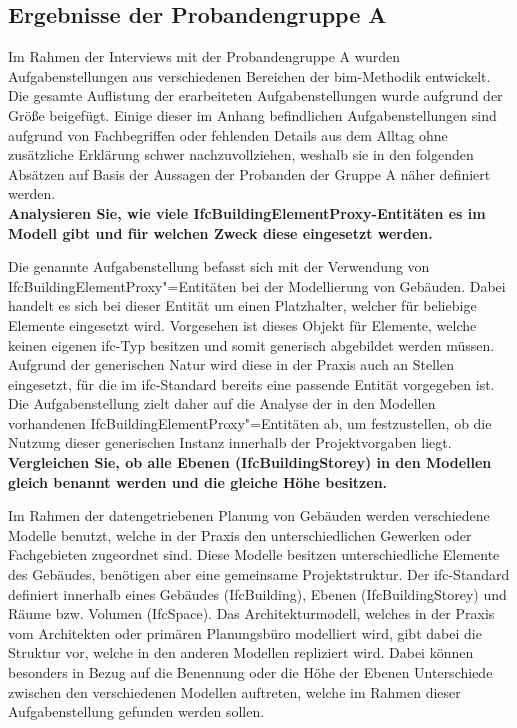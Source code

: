 \subsection{Ergebnisse der Probandengruppe A}
\label{sec:results-group-a}

Im Rahmen der Interviews mit der Probandengruppe A wurden Aufgabenstellungen aus verschiedenen Bereichen der \gls{bim}-Methodik entwickelt.
Die gesamte Auflistung der erarbeiteten Aufgabenstellungen wurde aufgrund der Größe beigefügt. 
Einige dieser im Anhang befindlichen Aufgabenstellungen sind aufgrund von Fachbegriffen oder fehlenden Details aus dem Alltag ohne zusätzliche Erklärung schwer nachzuvollziehen,
weshalb sie in den folgenden Absätzen auf Basis der Aussagen der Probanden der Gruppe A näher definiert werden. \\

\textbf{Analysieren Sie, wie viele IfcBuildingElementProxy-Entitäten es im Modell gibt und für welchen Zweck diese eingesetzt werden.}

Die genannte Aufgabenstellung befasst sich mit der Verwendung von IfcBuildingElementProxy"=Entitäten bei der Modellierung von Gebäuden. 
Dabei handelt es sich bei dieser Entität um einen Platzhalter, welcher für beliebige Elemente eingesetzt wird. 
Vorgesehen ist dieses Objekt für Elemente, welche keinen eigenen \gls{ifc}-Typ besitzen und somit generisch abgebildet werden müssen.
Aufgrund der generischen Natur wird diese in der Praxis auch an Stellen eingesetzt, für die im \gls{ifc}-Standard bereits eine passende Entität vorgegeben ist.
Die Aufgabenstellung zielt daher auf die Analyse der in den Modellen vorhandenen IfcBuildingElementProxy"=Entitäten ab, um festzustellen, 
ob die Nutzung dieser generischen Instanz innerhalb der Projektvorgaben liegt. \\

\textbf{Vergleichen Sie, ob alle Ebenen (IfcBuildingStorey) in den Modellen gleich benannt werden und die gleiche Höhe besitzen.}

Im Rahmen der datengetriebenen Planung von Gebäuden werden verschiedene Modelle benutzt, welche in der Praxis den unterschiedlichen Gewerken oder Fachgebieten zugeordnet sind.
Diese Modelle besitzen unterschiedliche Elemente des Gebäudes, benötigen aber eine gemeinsame Projektstruktur. 
Der \gls{ifc}-Standard definiert innerhalb eines Gebäudes (IfcBuilding), Ebenen (IfcBuildingStorey) und Räume bzw. Volumen (IfcSpace).
Das Architekturmodell, welches in der Praxis vom Architekten oder primären Planungsbüro modelliert wird, gibt dabei die Struktur vor, welche in den anderen Modellen repliziert wird.
Dabei können besonders in Bezug auf die Benennung oder die Höhe der Ebenen Unterschiede zwischen den verschiedenen Modellen auftreten, welche im Rahmen dieser Aufgabenstellung gefunden werden sollen. \\

